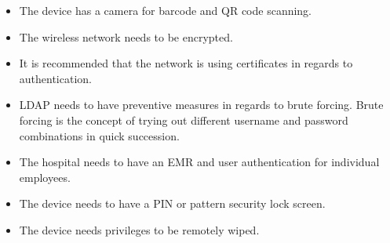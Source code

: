 \begin{itemize}
\item The device has a camera for barcode and QR code scanning.
\item The wireless network needs to be encrypted.
\item It is recommended that the network is using certificates in regards to authentication.
\item LDAP needs to have preventive measures in regards to brute forcing. Brute forcing is the concept of trying out different username and password combinations in quick succession.
\item The hospital needs to have an EMR and user authentication for individual employees.
\item The device needs to have a PIN or pattern security lock screen.
\item The device needs privileges  to be remotely wiped.
\end{itemize}